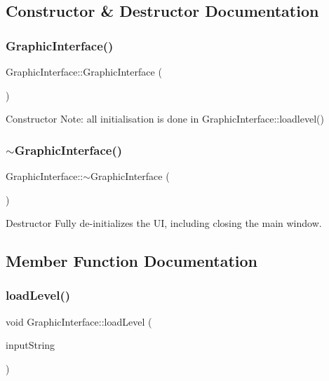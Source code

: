 \subsection{Constructor \& Destructor Documentation}
\mbox{\label{class_graphic_interface_accff331d036826a9c43e7bcd39165dc2}} 
\subsubsection{\texorpdfstring{Graphic\+Interface()}{GraphicInterface()}}
{\footnotesize\ttfamily Graphic\+Interface\+::\+Graphic\+Interface (\begin{DoxyParamCaption}{ }\end{DoxyParamCaption})}

Constructor Note\+: all initialisation is done in Graphic\+Interface\+::loadlevel() \mbox{\label{class_graphic_interface_a48f212964040a5baf30035420305c1f9}} 
\subsubsection{\texorpdfstring{$\sim$\+Graphic\+Interface()}{~GraphicInterface()}}
{\footnotesize\ttfamily Graphic\+Interface\+::$\sim$\+Graphic\+Interface (\begin{DoxyParamCaption}{ }\end{DoxyParamCaption})}

Destructor Fully de-\/initializes the UI, including closing the main window. 

\subsection{Member Function Documentation}
\mbox{\label{class_graphic_interface_a4237627c03422b22653a3a462bd1daa2}} 
\subsubsection{\texorpdfstring{load\+Level()}{loadLevel()}}
{\footnotesize\ttfamily void Graphic\+Interface\+::load\+Level (\begin{DoxyParamCaption}\item[{\mbox{\hyperlink{class_output_data}{Output\+Data}}}]{input\+String }\end{DoxyParamCaption})\hspace{0.3cm}{\ttfamily [virtual]}}

